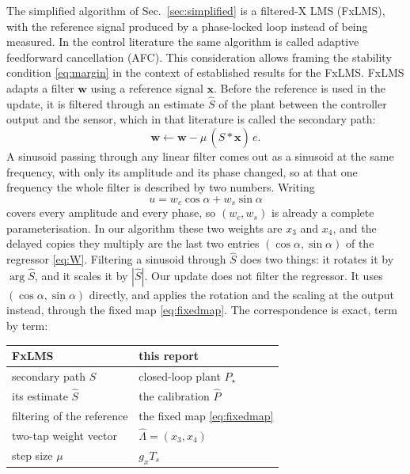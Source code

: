 \documentclass[11pt]{article}
\begin{document}
The simplified algorithm of Sec.~\ref{sec:simplified} is a filtered-X LMS (FxLMS), with the reference signal produced by a phase-locked loop instead of being measured.
%
In the control literature the same algorithm is called adaptive feedforward cancellation (AFC). 
%
This consideration allows framing the stability condition \eqref{eq:margin} in the context of established results for the FxLMS.
%
FxLMS adapts a filter $\mathbf{w}$ using a reference signal $\mathbf{x}$. 
%
Before the reference is used in the update, it is filtered through an estimate $\hat S$ of the plant between the controller output and the sensor, which in that literature is called the secondary path:
%
\begin{equation}
  \mathbf{w}\leftarrow\mathbf{w}-\mu\,(\hat S*\mathbf{x})\,e .
  \label{eq:fxlms}
\end{equation}
%
%
%
A sinusoid passing through any linear filter comes out as a sinusoid at the same frequency, with only its amplitude and its phase changed, so at that one frequency the whole filter is described by two numbers. Writing
%
\begin{equation}
  u = w_c\cos\alpha + w_s\sin\alpha
  \label{eq:twotap}
\end{equation}
%
covers every amplitude and every phase, so $(w_c,w_s)$ is already a complete parameterisation. In our algorithm these two weights are $x_3$ and $x_4$, and the delayed copies they multiply are the last two entries $(\cos\alpha,\sin\alpha)$ of the regressor \eqref{eq:W}.
%
Filtering a sinusoid through $\hat S$ does two things: it rotates it by $\arg\hat S$, and it scales it by $|\hat S|$. 
%
Our update does not filter the regressor.
%
It uses $(\cos\alpha,\sin\alpha)$ directly, and applies the rotation and the scaling at the output instead, through the fixed map \eqref{eq:fixedmap}.
%
%
The correspondence is exact, term by term:
\begin{center}\small
\begin{tabular}{ll}
\toprule
FxLMS & this report\\
\midrule
secondary path $S$              & closed-loop plant $P_\star$\\
its estimate $\hat S$           & the calibration $\hat P$\\
filtering of the reference      & the fixed map \eqref{eq:fixedmap}\\
two-tap weight vector           & $\hat\Lambda=(x_3,x_4)$\\
step size $\mu$                 & $g_xT_s$\\
\bottomrule
\end{tabular}
\end{center}
\end{document}
